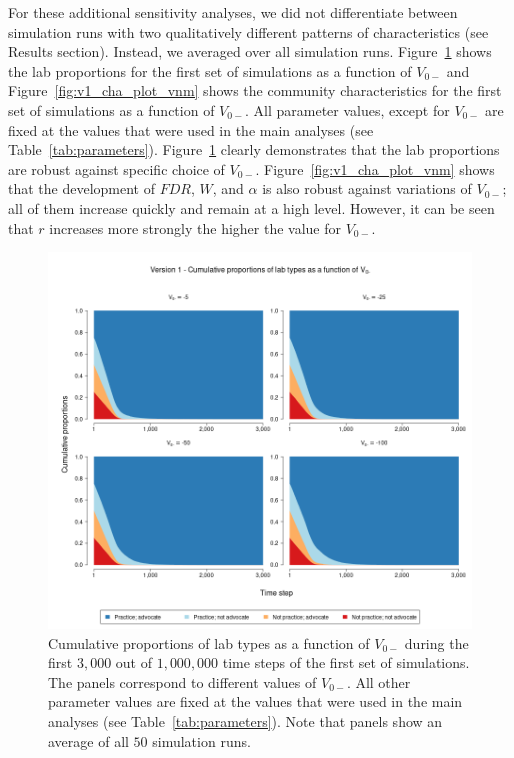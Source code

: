 \documentclass[meta, authordate]{jote-new-article}
\begin{document}
For these additional sensitivity analyses, we did not differentiate between simulation runs with two qualitatively different patterns of characteristics (see Results section). Instead, we averaged over all simulation runs. Figure~\ref{fig:v1_pro_plot_vnm} shows the lab proportions for the first set of simulations as a function of $V_{0-}$ and Figure~\ref{fig:v1_cha_plot_vnm} shows the community characteristics for the first set of simulations as a function of $V_{0-}$. All parameter values, except for $V_{0-}$ are fixed at the values that were used in the main analyses (see Table~\ref{tab:parameters}). Figure~\ref{fig:v1_pro_plot_vnm} clearly demonstrates that the lab proportions are robust against specific choice of $V_{0-}$. Figure~\ref{fig:v1_cha_plot_vnm} shows that the development of $FDR$, $W$, and $\alpha$ is also robust against variations of $V_{0-}$; all of them increase quickly and remain at a high level. However, it can be seen that $r$ increases more strongly the higher the value for $V_{0-}$.
%
\begin{figure}
  \begin{fullwidth}
    \centering
    \includegraphics[width=\textwidth]{v1_pro_plot_vnm.png}
    \caption{Cumulative proportions of lab types as a function of $V_{0-}$ during the first $3,000$ out of $1,000,000$ time steps of the first set of simulations. The panels correspond to different values of $V_{0-}$. All other parameter values are fixed at the values that were used in the main analyses (see Table~\ref{tab:parameters}). Note that panels show an average of all $50$ simulation runs.}
    \label{fig:v1_pro_plot_vnm}
  \end{fullwidth}
\end{figure}
\end{document}

